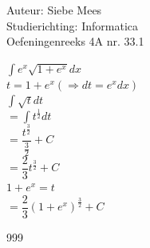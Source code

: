 \documentclass[a4paper]{article}
\begin{document}
  
\noindent \large Auteur: Siebe Mees \\
\noindent \large Studierichting: Informatica\\
\noindent \large Oefeningenreeks 4A nr. 33.1\\

\medskip

\normalsize

$\displaystyle\int e^x\sqrt{1+e^x}dx$\\

$t=1+e^x \left( \Rightarrow dt=e^x dx \right)$\\

$\displaystyle\int \sqrt{t}dt$\\

$=\displaystyle\int t^{\tfrac{1}{2}}dt$\\

$=\dfrac{t^{\tfrac{3}{2}}}{\tfrac{3}{2}}+C$\\

$=\dfrac{2}{3}t^{\tfrac{3}{2}}+C$\\

$ 1+e^x=t$\\ 

$=\dfrac{2}{3}(1+e^x)^{\tfrac{3}{2}}+C$\\

\begin{thebibliography}{999}
\end{thebibliography}
\end{document}
